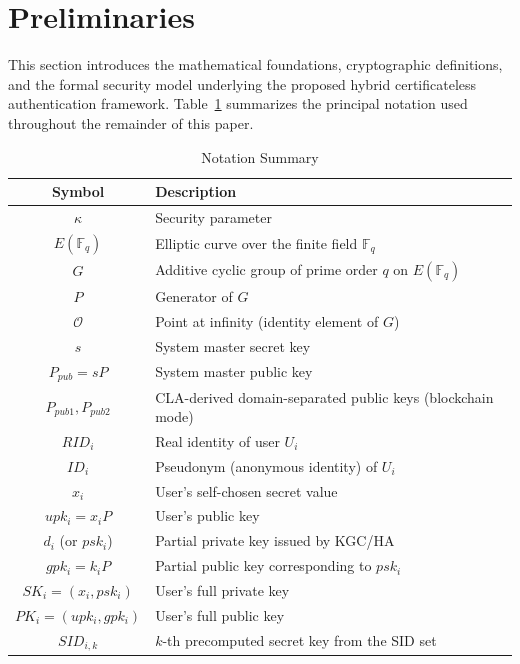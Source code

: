 \documentclass[conference]{IEEEtran}
\begin{document}
\section{Preliminaries}

This section introduces the mathematical foundations, cryptographic definitions, and the formal security model underlying the proposed hybrid certificateless authentication framework. Table~\ref{tab:notation} summarizes the principal notation used throughout the remainder of this paper.

\begin{table}[htbp]
\centering
\caption{Notation Summary}
\label{tab:notation}
\renewcommand{\arraystretch}{1.2}
\setlength{\tabcolsep}{6pt}
\begin{tabular}{|c|p{4.5cm}|}
\hline
\textbf{Symbol} & \textbf{Description} \\
\hline
$\kappa$ & Security parameter \\
\hline
$E(\mathbb{F}_q)$ & Elliptic curve over the finite field $\mathbb{F}_q$ \\
\hline
$G$ & Additive cyclic group of prime order $q$ on $E(\mathbb{F}_q)$ \\
\hline
$P$ & Generator of $G$ \\
\hline
$\mathcal{O}$ & Point at infinity (identity element of $G$) \\
\hline
$s$ & System master secret key \\
\hline
$P_{pub} = sP$ & System master public key \\
\hline
$P_{pub1}, P_{pub2}$ & CLA-derived domain-separated public keys (blockchain mode) \\
\hline
$RID_i$ & Real identity of user $U_i$ \\
\hline
$ID_i$ & Pseudonym (anonymous identity) of $U_i$ \\
\hline
$x_i$ & User's self-chosen secret value \\
\hline
$upk_i = x_i P$ & User's public key \\
\hline
$d_i$ (or $psk_i$) & Partial private key issued by KGC/HA \\
\hline
$gpk_i = k_i P$ & Partial public key corresponding to $psk_i$ \\
\hline
$SK_i = (x_i, psk_i)$ & User's full private key \\
\hline
$PK_i = (upk_i, gpk_i)$ & User's full public key \\
\hline
$SID_{i,k}$ & $k$-th precomputed secret key from the SID set \\
\hline

\end{tabular}
\end{table}
\end{document}
